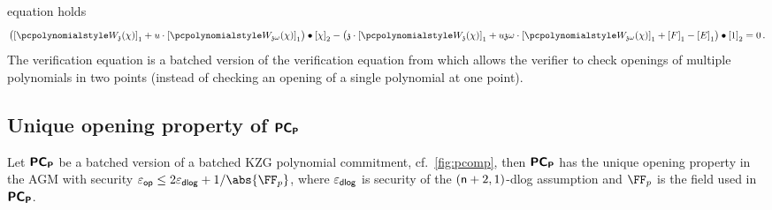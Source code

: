 \documentclass[runningheads,10pt]{llncs}
\begin{document}
\begin{description}
  equation holds
	\begin{multline}
		\label{eq:ver_eq}
		\left( \gone{\p{W_{\chz}}(\chi)} + u \cdot \gone{\p{W_{\chz
                \omega}}(\chi)} \right) \bullet
		\gtwo{\chi} - %
		\left( \chz \cdot \gone{\p{W_{\chz}}(\chi)} + u \chz \omega \cdot
          \gone{\p{W_{\chz \omega}}(\chi)} + \gone{F} - \gone{E} \right) \bullet
        \gtwo{1} = 0\,.
	\end{multline}
  The verification equation is a batched version of the verification equation
  from \cite{AC:KatZavGol10} which allows the verifier to check openings of
  multiple polynomials in two points (instead of checking an opening of a single
  polynomial at one point).
\end{description}

\subsection{Unique opening property of $\bm{\mathsf{PC}}_{\bm{\mathsf{P}}}$}
\begin{lemma}
\label{lem:pcomp_unique_op}
Let $\bm{\mathsf{PC}}_{\bm{\mathsf{P}}}$ be a batched version of a batched KZG polynomial
commitment, cf.~\cref{fig:pcomp}, then $\bm{\mathsf{PC}}_{\bm{\mathsf{P}}}$ has the unique opening property
in the AGM with security $\epsop \leq 2 \epsdlog + \infrac{1}{\abs{\FF_p}}$, where
$\varepsilon_{\mathsf{dlog}}$ is security of the $(\mathsf{n} + 2, 1)$-dlog assumption and $\FF_p$ is the
field used in $\bm{\mathsf{PC}}_{\bm{\mathsf{P}}}$.\end{lemma}
\end{document}
